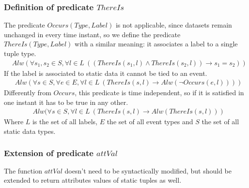 \subsubsection{Definition of predicate $ThereIs$}
The predicate $Occurs(Type, Label)$ is not applicable, since datasets remain unchanged in every time instant, so we define the predicate $ThereIs(Type, Label)$ with a similar meaning: it associates a label to a single tuple type.
\begin{align*}
  &Alw(\forall s_1,s_2 \in S, \forall l \in L\ ((ThereIs(s_1, l) \wedge ThereIs(s_2, l)) \rightarrow s_1=s_2))
\end{align*}
If the label is associated to static data it cannot be tied to an event.
\begin{align*}
  &Alw(\forall s \in S, \forall e \in E, \forall l \in L\ (ThereIs(s, l) \rightarrow Alw(\neg Occurs(e, l))))
\end{align*}
Differently from $Occurs$, this predicate is time independent, so if it is satisfied in one instant it has to be true in any other.
\begin{align*}
  &Alw(\forall s \in S, \forall l \in L\ (ThereIs(s, l) \rightarrow Alw(ThereIs(s, l)))
\end{align*} 
Where $L$ is the set of all labels, $E$ the set of all event types and $S$ the set of all static data types.

\subsubsection{Extension of predicate $attVal$}
The function $attVal$ doesn't need to be syntactically modified, but should be extended to return attributes values of static tuples as well.


